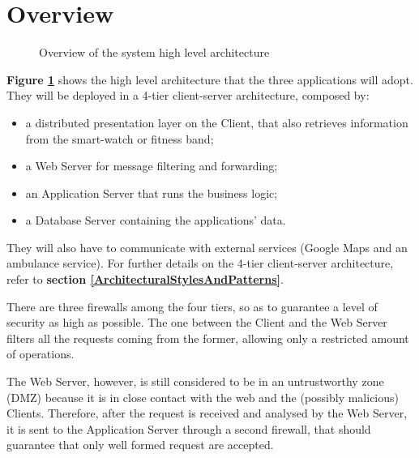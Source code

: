 \section{Overview}

\begin{figure}[H]
    \centering
    \caption{Overview of the system high level architecture}
    \label{fig:overview}
\end{figure}
\textbf{Figure \ref{fig:overview}} shows the high level architecture that the three applications will adopt.
They will be deployed in a 4-tier client-server architecture, composed by:
\begin{itemize}
    \item a distributed presentation layer on the Client, that also retrieves information from the smart-watch or fitness band;
    \item a Web Server for message filtering and forwarding;
    \item an Application Server that runs the business logic;
    \item a Database Server containing the applications' data.
\end{itemize}
They will also have to communicate with external services (Google Maps and an ambulance service). For further details on the 4-tier client-server architecture, refer to \textbf{section \ref{ArchitecturalStylesAndPatterns}}.

There are three firewalls among the four tiers, so as to guarantee a level of security as high as possible. The one between the Client and the Web Server filters all the requests coming from the former, allowing only a restricted amount of operations. 

The Web Server, however, is still considered to be in an untrustworthy zone (DMZ) because it is in close contact with the web and the (possibly malicious) Clients. Therefore, after the request is received and analysed by the Web Server, it is sent to the Application Server through a second firewall, that should guarantee that only well formed request are accepted. 

